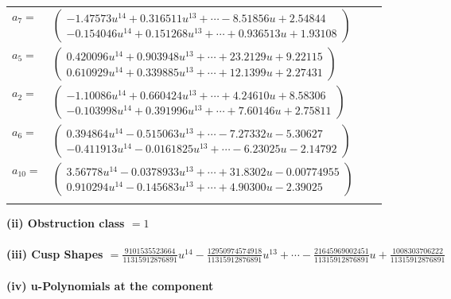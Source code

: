\documentclass[1p]{elsarticle_modified}
\theoremstyle{definition}
\begin{document}
\begin{tabular}{m{7pt} m{180pt} m{7pt} m{180pt} }
\flushright $a_{7}=$&$\begin{pmatrix}-1.47573 u^{14}+0.316511 u^{13}+\cdots-8.51856 u+2.54844\\-0.154046 u^{14}+0.151268 u^{13}+\cdots+0.936513 u+1.93108\end{pmatrix}$ \\
\flushright $a_{5}=$&$\begin{pmatrix}0.420096 u^{14}+0.903948 u^{13}+\cdots+23.2129 u+9.22115\\0.610929 u^{14}+0.339885 u^{13}+\cdots+12.1399 u+2.27431\end{pmatrix}$ \\
\flushright $a_{2}=$&$\begin{pmatrix}-1.10086 u^{14}+0.660424 u^{13}+\cdots+4.24610 u+8.58306\\-0.103998 u^{14}+0.391996 u^{13}+\cdots+7.60146 u+2.75811\end{pmatrix}$ \\
\flushright $a_{6}=$&$\begin{pmatrix}0.394864 u^{14}-0.515063 u^{13}+\cdots-7.27332 u-5.30627\\-0.411913 u^{14}-0.0161825 u^{13}+\cdots-6.23025 u-2.14792\end{pmatrix}$ \\
\flushright $a_{10}=$&$\begin{pmatrix}3.56778 u^{14}-0.0378933 u^{13}+\cdots+31.8302 u-0.00774955\\0.910294 u^{14}-0.145683 u^{13}+\cdots+4.90300 u-2.39025\end{pmatrix}$\\&\end{tabular}
\flushleft \textbf{(ii) Obstruction class $= 1$}\\~\\
\flushleft \textbf{(iii) Cusp Shapes $= \frac{9101535523664}{11315912876891} u^{14}-\frac{12950974574918}{11315912876891} u^{13}+\cdots-\frac{21645969002451}{11315912876891} u+\frac{1008303706222}{11315912876891}$}\\~\\
\newpage\renewcommand{\arraystretch}{1}
\flushleft \textbf{(iv) u-Polynomials at the component}\newline \\
\end{document}
